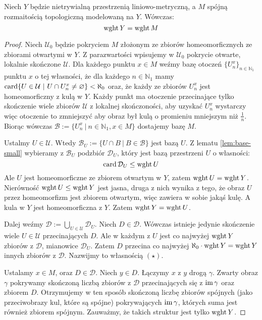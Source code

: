 \begin{lem}
  Niech $Y$ będzie nietrywialną przestrzenią liniowo-metryczną, a $M$ spójną rozmaitością topologiczną modelowaną na $Y$. Wówczas:
  \[
    \operatorname{wght} Y = \operatorname{wght} M
  \]
  \begin{proof}
    Niech $\mathcal U_0$ będzie pokryciem $M$ złożonym ze zbiorów homeomorficznych ze zbiorami otwartymi w $Y$. Z parazwartości wpisujemy w $\mathcal U_0$ pokrycie otwarte, lokalnie skończone $\mathcal U$. Dla każdego punktu $x \in M$ weźmy bazę otoczeń $\{U_n^x\}_{n \in \mathbb{N}_1}$ punktu $x$ o tej własności, że dla każdego $n \in \mathbb{N}_1$ mamy $\operatorname{card}\{U \in \mathcal U\ |\ U \cap U_n^x \neq \varnothing\} < \aleph_0$ oraz, że każdy ze zbiorów $U_n^x$ jest homeomorficzny z kulą w $Y$. Każdy punkt ma otoczenie przecinające tylko skończenie wiele zbiorów $\mathcal U$ z lokalnej skończoności, aby uzyskać $U_n^x$ wystarczy więc otoczenie to zmniejszyć aby obraz był kulą o promieniu mniejszym niż $\frac{1}{n}$. Biorąc wówczas $\mathcal B := \{U_n^x\ |\ n \in \mathbb{N}_1, x \in M\}$ dostajemy bazę $M$.
    
    Ustalmy $U \in \mathcal U$. Wtedy $\mathcal B_U := \{U \cap B\ |\ B \in \mathcal B\}$ jest bazą $U$. Z lematu \ref{lem:base-small} wybieramy z $\mathcal B_U$ podzbiór $\mathcal D_U$, który jest bazą przestrzeni $U$ o własności:
    \[
      \operatorname{card} \mathcal D_U \leq \operatorname{wght} U
    \]
    Ale $U$ jest homeomorficzne ze zbiorem otwartym w $Y$, zatem $\operatorname{wght} U = \operatorname{wght} Y$. Nierówność $\operatorname{wght} U \leq \operatorname{wght} Y$ jest jasna, druga z nich wynika z tego, że obraz $U$ przez homeomorfizm jest zbiorem otwartym, więc zawiera w sobie jakąś kulę. A kula w $Y$ jest homeomorficzna z $Y$. Zatem $\operatorname{wght} Y = \operatorname{wght} U$.
    
    Dalej weźmy $\mathcal D := \bigcup_{U \in \mathcal U} \mathcal D_U$.
    Niech $D \in \mathcal D$. Wówczas istnieje jedynie skończenie wiele $U \in \mathcal U$ przecinających $D$. Ale w każdym z $U$ jest co najwyżej $\operatorname{wght} Y$ zbiorów z $\mathcal D$, mianowice $\mathcal D_U$. Zatem $D$ przecina co najwyżej $\aleph_0 \cdot \operatorname{wght} Y = \operatorname{wght} Y$ innych zbiorów z $\mathcal D$. Nazwijmy to własnością $(\star)$.
    
    Ustalamy $x \in M$, oraz $D \in \mathcal D$. Niech $y \in D$. Łączymy $x$ z $y$ drogą $\gamma$. Zwarty obraz $\gamma$ pokrywamy skończoną liczbą zbiorów z $\mathcal D$ przecinających się z $\operatorname{im}\gamma$ oraz zbiorem $D$. Otrzymujemy w ten sposób skończoną liczbę zbiorów spójnych (jako przeciwobrazy kul, które są spójne) pokrywających $\operatorname{im}\gamma$, których suma jest również zbiorem spójnym. Zauważmy, że takich struktur jest tylko $\operatorname{wght} Y$. 
    

\end{proof}
\end{lem}
